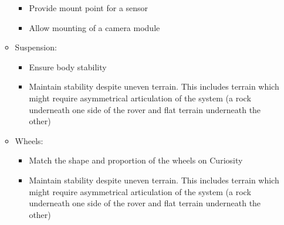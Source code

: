 \begin{itemize}
\begin{itemize}
\begin{itemize}
            \item Provide mount point for a sensor
            \item Allow mounting of a camera module
          \end{itemize}
          \item Suspension:
          \begin{itemize}
            \item Ensure body stability
            \item Maintain stability despite uneven terrain. This includes terrain which might require asymmetrical articulation of the system (a rock underneath one side of the rover and flat terrain underneath the other)
          \end{itemize}
          \item Wheels:
          \begin{itemize}
            \item Match the shape and proportion of the wheels on Curiosity
            \item Maintain stability despite uneven terrain. This includes terrain which might require asymmetrical articulation of the system (a rock underneath one side of the rover and flat terrain underneath the other)
          \end{itemize}
        \end{itemize}
        

\end{itemize}

